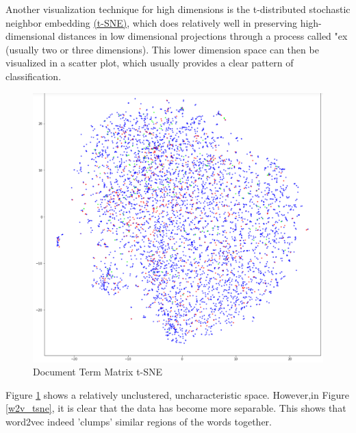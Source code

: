 \documentclass[letterpaper, 12 pt, conference]{ieeeconf}  %
\begin{document}
Another visualization technique for high dimensions is the t-distributed stochastic neighbor embedding \href{https://lvdmaaten.github.io/tsne/}{(t-SNE)}, which does relatively well in preserving high-dimensional distances in low dimensional projections through a process called "ex (usually two or three dimensions). This lower dimension space can then be visualized in a scatter plot, which usually provides a clear pattern of classification.

\begin{figure}[h]
	\centering
	\includegraphics[scale=0.1]{dtw_tsne.png}
	\caption{Document Term Matrix t-SNE}
    \label{dtm_tsne}
\end{figure}

Figure \ref{dtm_tsne} shows a relatively unclustered, uncharacteristic space. However,in Figure \ref{w2v_tsne}, it is clear that the data has become more separable. This shows that word2vec indeed 'clumps' similar regions of the words together.
\end{document}
